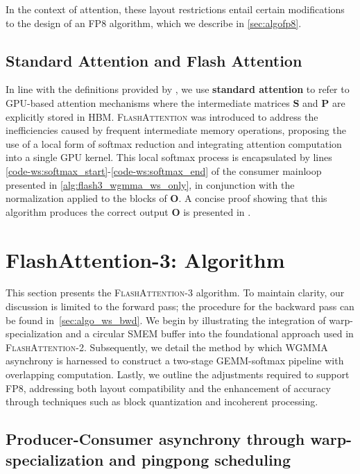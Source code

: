 In the context of attention, these layout restrictions entail certain modifications to the design of an FP8 algorithm, which we describe in \cref{sec:algofp8}.

\subsection{Standard Attention and Flash Attention} In line with the definitions provided by \citet{dao2022flashattention}, we use \textbf{standard attention} to refer to GPU-based attention mechanisms where the intermediate matrices $\mathbf{S}$ and $\mathbf{P}$ are explicitly stored in HBM. \textsc{FlashAttention} was introduced to address the inefficiencies caused by frequent intermediate memory operations, proposing the use of a local form of softmax reduction and integrating attention computation into a single GPU kernel. This local softmax process is encapsulated by lines \ref{code-ws:softmax_start}-\ref{code-ws:softmax_end} of the consumer mainloop presented in \cref{alg:flash3_wgmma_ws_only}, in conjunction with the normalization applied to the blocks of $\mathbf{O}$. A concise proof showing that this algorithm produces the correct output $\mathbf{O}$ is presented in \cite[\S 2.3.1]{dao2023flashattention2}.

\section{FlashAttention-3: Algorithm}
\label{sec:algo}

This section presents the \textsc{FlashAttention-3} algorithm. To maintain clarity, our discussion is limited to the forward pass; the procedure for the backward pass can be found in~\cref{sec:algo_ws_bwd}. We begin by illustrating the integration of warp-specialization and a circular SMEM buffer into the foundational approach used in \textsc{FlashAttention-2}. Subsequently, we detail the method by which WGMMA asynchrony is harnessed to construct a two-stage GEMM-softmax pipeline with overlapping computation. Lastly, we outline the adjustments required to support FP8, addressing both layout compatibility and the enhancement of accuracy through techniques such as block quantization and incoherent processing.

\subsection{Producer-Consumer asynchrony through warp-specialization and pingpong scheduling}
\label{sec:algo_ws}

